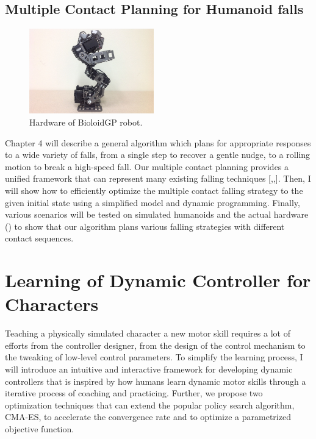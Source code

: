 \subsection{Multiple Contact Planning for Humanoid falls}
\begin{figure}
 \vspace{-25pt}
  \begin{center}
    \includegraphics[width=0.48\textwidth]{images/intro_hardware.jpg}
  \end{center}
   \vspace{-25pt}
  \caption{Hardware of BioloidGP robot.}
   \vspace{-10pt}
  \label{fig:intro_hardware}
\end{figure}
Chapter 4 will describe a general algorithm which plans for appropriate 
responses to a wide variety of falls, from a single step to recover a gentle nudge, to a rolling motion to break a high-speed fall.
Our multiple contact planning provides a unified framework
that can represent many existing falling techniques [,,].
Then, I will show how to efficiently optimize the multiple contact falling
strategy to the given initial state using a simplified model and dynamic 
programming.
Finally, various scenarios will be tested on simulated humanoids and the
actual hardware () to show that our algorithm plans
various falling strategies with different contact sequences.

\section{Learning of Dynamic Controller for Characters}
Teaching a physically simulated character a new motor skill requires 
a lot of efforts from the controller designer, from the design of the control 
mechanism to the tweaking of low-level control parameters.
To simplify the learning process, I will introduce an intuitive and 
interactive framework for developing dynamic controllers that is inspired by
how humans learn dynamic motor skills through a iterative process of coaching
and practicing.
Further, we propose two optimization techniques that can extend the popular
policy search algorithm, CMA-ES, to accelerate the convergence rate
and to optimize a parametrized objective function.

